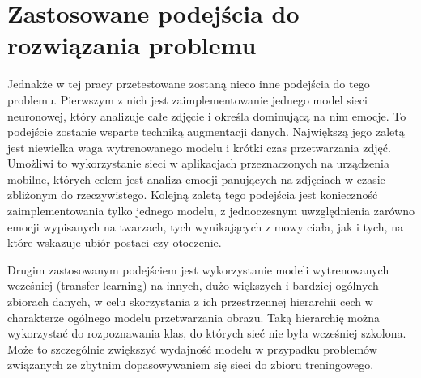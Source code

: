 \section{Zastosowane podejścia do rozwiązania problemu}
Jednakże w tej pracy przetestowane zostaną nieco inne podejścia do tego problemu. Pierwszym z nich jest zaimplementowanie jednego model sieci neuronowej, który analizuje całe zdjęcie i określa dominującą na nim emocje. To podejście zostanie wsparte techniką augmentacji danych. Największą jego zaletą jest niewielka waga wytrenowanego modelu i krótki czas przetwarzania zdjęć. Umożliwi to wykorzystanie sieci w aplikacjach przeznaczonych na urządzenia mobilne, których celem jest analiza emocji panujących na zdjęciach w czasie zbliżonym do rzeczywistego. Kolejną zaletą tego podejścia jest konieczność zaimplementowania tylko jednego modelu, z jednoczesnym uwzględnienia zarówno emocji wypisanych na twarzach, tych wynikających z mowy ciała, jak i tych, na które wskazuje ubiór postaci czy otoczenie.

Drugim zastosowanym podejściem jest wykorzystanie modeli wytrenowanych wcześniej (transfer learning) na innych, dużo większych i bardziej ogólnych zbiorach danych, w celu skorzystania z ich przestrzennej hierarchii cech w charakterze ogólnego modelu przetwarzania obrazu. Taką hierarchię można wykorzystać do rozpoznawania klas, do których sieć nie była wcześniej szkolona. Może to szczególnie zwiększyć wydajność modelu w przypadku problemów związanych ze zbytnim dopasowywaniem się sieci do zbioru treningowego.
